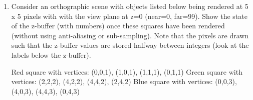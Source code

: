 \documentclass{article}
\begin{document}
\begin{enumerate}
\begin{enumerate}
                    \begin{mdframed}
                        Only the specular would change. 
                        \begin{displaymath}
                            h = \frac{e + l}{||e + l||}
                        \end{displaymath}
                        \begin{displaymath}
                            h =\frac{[0, 2, 0] + [0, 1, 0]}{||e + l||}
                        \end{displaymath}
                        \begin{displaymath}
                            h = [0, 3, 0]/3
                        \end{displaymath}
                        \begin{displaymath}
                            (h \cdot n)^p = (1)^2 = 1
                        \end{displaymath}
                        \begin{displaymath}
                            c = c_l * 0.1 = RGB(1.0, 0.0, 0.0)
                        \end{displaymath}

                        Meaning the new color is

                        \begin{displaymath}
                            c = c_a + c_d + c_s = RGB(1.6, 0.0, 0.0)
                            = RGB(1.0, 0.0, 0.0)
                        \end{displaymath}
                    \end{mdframed}
            \end{enumerate}

            \break
        \item Consider an orthographic scene with objects listed below being rendered at 5 x
            5 pixels with with the view plane at z=0 (near=0, far=99). Show the state of
            the z-buffer (with numbers) once these squares have been rendered (without using
            anti-aliasing or sub-sampling). Note that the pixels are drawn such that the z-buffer
            values are stored halfway between integers (look at the labels below the z-buffer).

            Red square with vertices: (0,0,1), (1,0,1), (1,1,1), (0,1,1)
            Green square with vertices: (2,2,2), (4,2,2), (4,4,2), (2,4,2)
            Blue square with vertices: (0,0,3), (4,0,3), (4,4,3), (0,4,3)


\end{enumerate}
\end{document}
